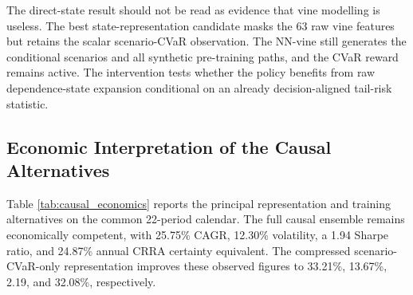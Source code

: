 The direct-state result should not be read as evidence that vine modelling is useless. The best state-representation candidate masks the 63 raw vine features but retains the scalar scenario-CVaR observation. The NN-vine still generates the conditional scenarios and all synthetic pre-training paths, and the CVaR reward remains active. The intervention tests whether the policy benefits from raw dependence-state expansion conditional on an already decision-aligned tail-risk statistic.

\subsection{Economic Interpretation of the Causal Alternatives}
\label{subsec:4_causal_economics}

Table \ref{tab:causal_economics} reports the principal representation and training alternatives on the common 22-period calendar. The full causal ensemble remains economically competent, with 25.75\% CAGR, 12.30\% volatility, a 1.94 Sharpe ratio, and 24.87\% annual CRRA certainty equivalent. The compressed scenario-CVaR-only representation improves these observed figures to 33.21\%, 13.67\%, 2.19, and 32.08\%, respectively.

\begin{table}[H]
\centering
\caption{Selected Post-Holdout Causal Ensembles on the Common Calendar}
\label{tab:causal_economics}
\caption*{\footnotesize Notes: These are post-holdout explanatory ensembles, not newly selected confirmatory strategies. Historical-only training omits synthetic pre-training but otherwise follows the matched causal contract.}
\end{table}

